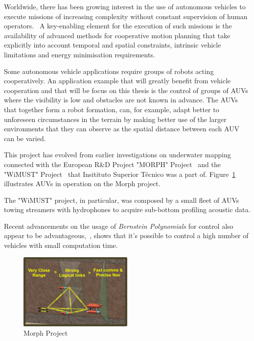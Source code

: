 \par Worldwide, there has been growing interest in the use of autonomous vehicles to execute missions of increasing complexity without constant supervision of human operators.~\cite{xargay2012time} A key-enabling element for the execution of such missions is the availability of advanced methods for cooperative motion planning that take explicitly into account temporal and spatial constraints, intrinsic vehicle limitations and energy minimisation requirements. 
\par Some autonomous vehicle applications require groups of robots acting cooperatively. An application example that will greatly benefit from vehicle cooperation and that will be focus on this thesis is the control of groups of \acp{AUV} where the visibility is low and obstacles are not known in advance. The \acp{AUV} that together form a robot formation, can, for example, adapt better to unforeseen circumstances in the terrain by making better use of the larger environments that they can observe as the spatial distance between each \ac{AUV} can be varied.
\par This project has evolved from earlier investigations on underwater mapping connected with the European R\&D Project "MORPH" Project~\cite{morph,aguiar2009cooperative} and the "WiMUST" Project~\cite{abreu2016widely} that Insitituto Superior Técnico was a part of. Figure~\ref{fig:morph} illustrates \acp{AUV} in operation on the Morph project.
\par The "WiMUST" project, in particular, was composed by a small fleet of \acp{AUV} towing streamers with hydrophones to acquire sub-bottom profiling acoustic data.
\par Recent advancements on the usage of \textit{Bernstein Polynomials} for control also appear to be advantageous,~\cite{cichella2018bernstein}, shows that it's possible to control a high number of vehicles with small computation time.

\begin{figure}[h!]
    \centering
    \includegraphics[width=0.5\textwidth]{Images/projects/Picture2.png}
    \caption{Morph Project}
    \label{fig:morph}
\end{figure}
    
